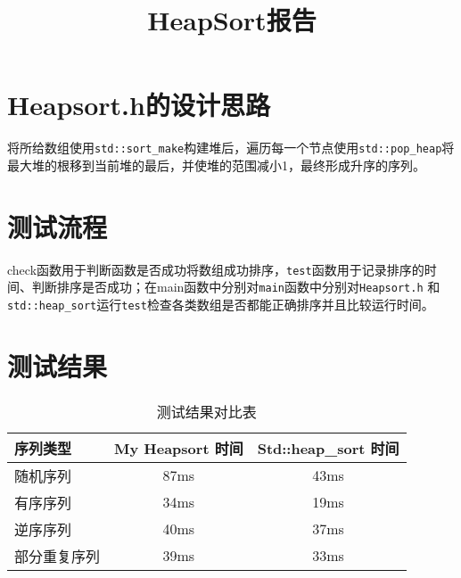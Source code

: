 \documentclass{article}
\title{HeapSort报告}
\author{}
\date{}
\begin{document}
\maketitle
\section{Heapsort.h的设计思路}
将所给数组使用\texttt{std::sort\_make}构建堆后，遍历每一个节点使用\texttt{std::pop\_heap}将最大堆的根移到当前堆的最后，并使堆的范围减小1，最终形成升序的序列。
\section{测试流程}
check函数用于判断函数是否成功将数组成功排序，\texttt{test}函数用于记录排序的时间、判断排序是否成功；在main函数中分别对\texttt{main}函数中分别对\texttt{Heapsort.h} 和\texttt{std::heap\_sort}运行\texttt{test}检查各类数组是否都能正确排序并且比较运行时间。
\section{测试结果}
\begin{table}[h!]
    \centering
    \begin{tabular}{|l|c|c|}
    \hline
    序列类型 & My Heapsort 时间 & Std::heap\_sort 时间 \\
    \hline  
    随机序列 & 87ms & 43ms \\
    \hline 
    有序序列 & 34ms & 19ms \\
    \hline
    逆序序列 & 40ms & 37ms \\
    \hline
    部分重复序列 & 39ms & 33ms \\
    \hline
    \end{tabular}
    \caption{测试结果对比表}
    \end{table}
\end{document}
